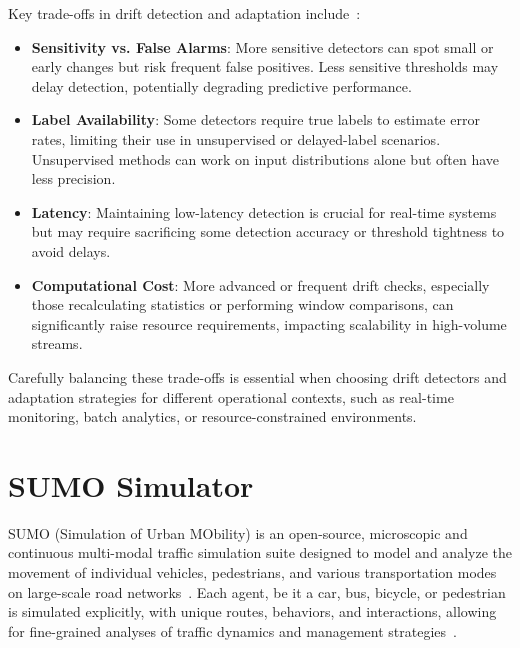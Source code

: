 Key trade-offs in drift detection and adaptation include~\cite{zliobaite2014survey}:

\begin{itemize}
    \item \textbf{Sensitivity vs. False Alarms}: More sensitive detectors can spot small or early changes but risk frequent false positives.
        Less sensitive thresholds may delay detection, potentially degrading predictive performance.

    \item \textbf{Label Availability}: Some detectors require true labels to estimate error rates, limiting their use in unsupervised or delayed-label scenarios.
        Unsupervised methods can work on input distributions alone but often have less precision.

    \item \textbf{Latency}: Maintaining low-latency detection is crucial for real-time systems but may require sacrificing some detection accuracy or threshold tightness to avoid delays.

    \item \textbf{Computational Cost}: More advanced or frequent drift checks, especially those recalculating statistics or performing window comparisons, can significantly raise resource requirements, impacting scalability in high-volume streams.
\end{itemize}

Carefully balancing these trade-offs is essential when choosing drift detectors and adaptation strategies for different operational contexts, such as real-time monitoring, batch analytics, or resource-constrained environments.

\section{SUMO Simulator}

SUMO (Simulation of Urban MObility) is an open-source, microscopic and continuous multi-modal traffic simulation suite designed to model and analyze the movement of individual vehicles, pedestrians, and various transportation modes on large-scale road networks~\cite{sumo2024}.
Each agent, be it a car, bus, bicycle, or pedestrian is simulated explicitly, with unique routes, behaviors, and interactions, allowing for fine-grained analyses of traffic dynamics and management strategies~\cite{espinosa2021traffic}.

